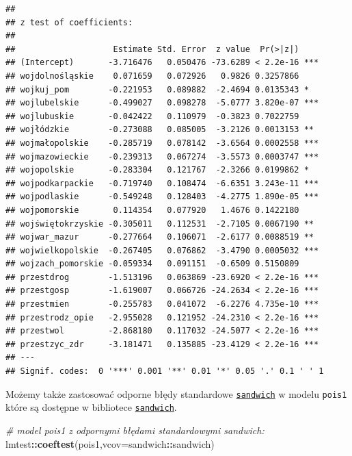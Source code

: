 \documentclass[polish,]{book}
\newenvironment{Shaded}{\begin{snugshade}}{\end{snugshade}}
\newcommand{\CommentTok}[1]{\textcolor[rgb]{0.56,0.35,0.01}{\textit{#1}}}
\newcommand{\DataTypeTok}[1]{\textcolor[rgb]{0.13,0.29,0.53}{#1}}
\newcommand{\KeywordTok}[1]{\textcolor[rgb]{0.13,0.29,0.53}{\textbf{#1}}}
\newcommand{\NormalTok}[1]{#1}
\newcommand{\OperatorTok}[1]{\textcolor[rgb]{0.81,0.36,0.00}{\textbf{#1}}}
\begin{document}
\begin{verbatim}
## 
## z test of coefficients:
## 
##                    Estimate Std. Error  z value  Pr(>|z|)    
## (Intercept)       -3.716476   0.050476 -73.6289 < 2.2e-16 ***
## wojdolnośląskie    0.071659   0.072926   0.9826 0.3257866    
## wojkuj_pom        -0.221953   0.089882  -2.4694 0.0135343 *  
## wojlubelskie      -0.499027   0.098278  -5.0777 3.820e-07 ***
## wojlubuskie       -0.042422   0.110979  -0.3823 0.7022759    
## wojłódzkie        -0.273088   0.085005  -3.2126 0.0013153 ** 
## wojmałopolskie    -0.285719   0.078142  -3.6564 0.0002558 ***
## wojmazowieckie    -0.239313   0.067274  -3.5573 0.0003747 ***
## wojopolskie       -0.283304   0.121767  -2.3266 0.0199862 *  
## wojpodkarpackie   -0.719740   0.108474  -6.6351 3.243e-11 ***
## wojpodlaskie      -0.549248   0.128403  -4.2775 1.890e-05 ***
## wojpomorskie       0.114354   0.077920   1.4676 0.1422180    
## wojświętokrzyskie -0.305011   0.112531  -2.7105 0.0067190 ** 
## wojwar_mazur      -0.277664   0.106071  -2.6177 0.0088519 ** 
## wojwielkopolskie  -0.267405   0.076862  -3.4790 0.0005032 ***
## wojzach_pomorskie -0.059334   0.091151  -0.6509 0.5150809    
## przestdrog        -1.513196   0.063869 -23.6920 < 2.2e-16 ***
## przestgosp        -1.619007   0.066726 -24.2634 < 2.2e-16 ***
## przestmien        -0.255783   0.041072  -6.2276 4.735e-10 ***
## przestrodz_opie   -2.955028   0.121952 -24.2310 < 2.2e-16 ***
## przestwol         -2.868180   0.117032 -24.5077 < 2.2e-16 ***
## przestzyc_zdr     -3.181471   0.135885 -23.4129 < 2.2e-16 ***
## ---
## Signif. codes:  0 '***' 0.001 '**' 0.01 '*' 0.05 '.' 0.1 ' ' 1
\end{verbatim}

Możemy także zastosować odporne błędy standardowe \href{https://rdrr.io/cran/sandwich/man/sandwich.html}{\texttt{sandwich}} w modelu \texttt{pois1}
które są dostępne w bibliotece \href{https://rdrr.io/cran/sandwich/man/}{\texttt{sandwich}}.

\begin{Shaded}
\begin{Highlighting}[]
\CommentTok{# model pois1 z odpornymi błędami standardowymi sandwich:}
\NormalTok{lmtest}\OperatorTok{::}\KeywordTok{coeftest}\NormalTok{(pois1,}\DataTypeTok{vcov=}\NormalTok{sandwich}\OperatorTok{::}\NormalTok{sandwich)}
\end{Highlighting}
\end{Shaded}
\end{document}
